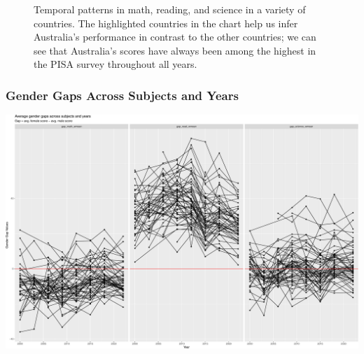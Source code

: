 \documentclass[
  11pt,
  a4paper,
]{article}
\begin{document}
\begin{figure}[H]


\caption{\label{fig-bsplot}Temporal patterns in math, reading, and
science in a variety of countries. The highlighted countries in the
chart help us infer Australia's performance in contrast to the other
countries; we can see that Australia's scores have always been among the
highest in the PISA survey throughout all years.}

\end{figure}%

\subsubsection{Gender Gaps Across Subjects and
Years}\label{gender-gaps-across-subjects-and-years}

\includegraphics{Learningtower_Rpackage_files/figure-pdf/unnamed-chunk-21-1.pdf}
\end{document}
